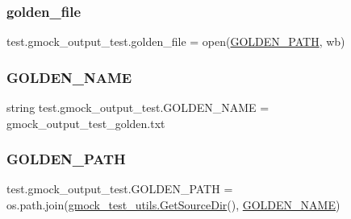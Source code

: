 \mbox{\label{namespacetest_1_1gmock__output__test_a0a2750f2a710016f3a48240066ee34aa}} 
\subsubsection{\texorpdfstring{golden\_file}{golden\_file}}
{\footnotesize\ttfamily test.\+gmock\+\_\+output\+\_\+test.\+golden\+\_\+file = open(\mbox{\hyperlink{namespacetest_1_1gmock__output__test_afd31f75a24e5cf0ca7e226b696305fe0}{G\+O\+L\+D\+E\+N\+\_\+\+P\+A\+TH}}, \textquotesingle{}wb\textquotesingle{})}

\mbox{\label{namespacetest_1_1gmock__output__test_a44f96ff6816d6080b14e46b1c847736a}} 
\subsubsection{\texorpdfstring{GOLDEN\_NAME}{GOLDEN\_NAME}}
{\footnotesize\ttfamily string test.\+gmock\+\_\+output\+\_\+test.\+G\+O\+L\+D\+E\+N\+\_\+\+N\+A\+ME = \textquotesingle{}gmock\+\_\+output\+\_\+test\+\_\+golden.\+txt\textquotesingle{}}

\mbox{\label{namespacetest_1_1gmock__output__test_afd31f75a24e5cf0ca7e226b696305fe0}} 
\subsubsection{\texorpdfstring{GOLDEN\_PATH}{GOLDEN\_PATH}}
{\footnotesize\ttfamily test.\+gmock\+\_\+output\+\_\+test.\+G\+O\+L\+D\+E\+N\+\_\+\+P\+A\+TH = os.\+path.\+join(\mbox{\hyperlink{namespacetest_1_1gmock__test__utils_a7d61daab1cfc01ded5e90e580cd70c51}{gmock\+\_\+test\+\_\+utils.\+Get\+Source\+Dir}}(), \mbox{\hyperlink{namespacetest_1_1gmock__output__test_a44f96ff6816d6080b14e46b1c847736a}{G\+O\+L\+D\+E\+N\+\_\+\+N\+A\+ME}})}

